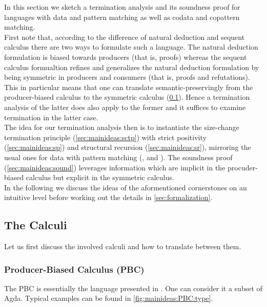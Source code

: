 In this section we sketch a termination analysis and its soundness proof for languages with data and pattern matching as well as codata and copattern matching.
\\
First note that, according to the difference of natural deduction and sequent calculus there are two ways to formulate such a language.
The natural deduction formulation is biased towards producers (that is, proofs) whereas the sequent calculus formualtion refines and generalizes the natural deduction formulation by being symmetric in producers and consumers (that is, proofs and refutations).
This in particular means that one can translate semantic-preservingly from the producer-biased calculus to the symmetric calculus (\cref{sec:mainideas:calculi}).
Hence a termination analysis of the latter does also apply to the former and it suffices to examine termination in the latter case.
\\
The idea for our termination analysis then is to instantiate the size-change termination principle (\cref{sec:mainideas:sctp}) with strict positivity (\cref{sec:mainideas:sp}) and structural recursion (\cref{sec:mainideas:sr}), mirroring the usual ones for data with pattern matching (\cite{10.1007/BFb0037116}, \cite{Abel2002foetusT} and \cite{10.1017/S0956796801004191}).
The soundness proof (\cref{sec:mainideas:sound}) leverages information which are implicit in the procuder-biased calculus but explicit in the symmetric calculus.
\\
In the following we discuss the ideas of the aformentioned cornerstones on an intuitive level before working out the details in \cref{sec:formalization}.

\subsection{The Calculi}
\label{sec:mainideas:calculi}

Let us first discuss the involved calculi and how to translate between them.

\subsubsection{Producer-Biased Calculus (PBC)}

The PBC is essentially the language presented in \cite{10.1145/2858949.2784763}.
One can consider it a subset of Agda.
Typical examples can be found in \cref{fig:mainideas:PBC:type}.


